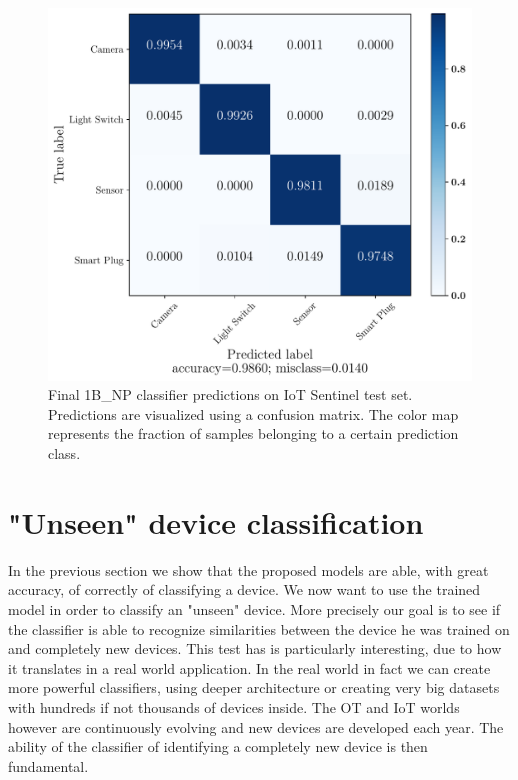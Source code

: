 
\begin{figure}[h]
\begin{minipage}{0.6\linewidth}
    \centering
        \includegraphics[width=\textwidth]{images/results/IoT_clasf_20210613-175027__type_1branch_no_pool__st_scale_sub__lb_30__act_elu__nf_16__ks_10__nn_50__l2_1e-05__bs_200__ep_300___cm.pdf}
\end{minipage}
\hfill
\begin{minipage}{0.29\linewidth}
  \caption{Final 1B\_NP classifier predictions on IoT Sentinel test set. Predictions are visualized using a confusion matrix.  The color map represents the fraction of samples belonging to a certain prediction class.} 
  \label{fig:iot_results_cm}
\end{minipage}
\end{figure}


\section{"Unseen" device classification}\label{res_unseen}

In the previous section we show that the proposed models are able, with great accuracy, of correctly of classifying a device. We now want to use the trained model in order to classify an "unseen" device.
More precisely our goal is to see if the classifier is able to recognize similarities between the device he was trained on and completely new devices. This test has is particularly interesting, due to how it translates in a real world application. In the real world in fact we can create more powerful classifiers, using deeper architecture or creating very big datasets with hundreds if not thousands of devices inside. The OT and IoT worlds however are continuously evolving and new devices are developed each year. The ability of the classifier of identifying a completely new device is then fundamental.

